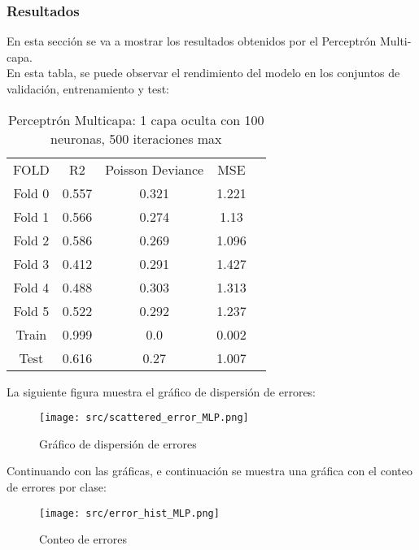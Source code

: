 \subsubsection*{Resultados}
En esta sección se va a mostrar los resultados obtenidos por el Perceptrón Multi-capa. \\
\linebreak
En esta tabla, se puede observar el rendimiento del modelo en los conjuntos de validación, entrenamiento y test:
\begin{table}[H]
	\centering
	\begin{tabular}{|c|c|c|c|c}
		\cline{1-4}
		FOLD   & R2    & Poisson Deviance & MSE   \\\cline{1-4}
		Fold 0 & 0.557 & 0.321            & 1.221 \\\cline{1-4}
		Fold 1 & 0.566 & 0.274            & 1.13  \\\cline{1-4}
		Fold 2 & 0.586 & 0.269            & 1.096 \\\cline{1-4}
		Fold 3 & 0.412 & 0.291            & 1.427 \\\cline{1-4}
		Fold 4 & 0.488 & 0.303            & 1.313 \\\cline{1-4}
		Fold 5 & 0.522 & 0.292            & 1.237 \\\cline{1-4}
		Train  & 0.999 & 0.0              & 0.002 \\\cline{1-4}
		Test   & 0.616 & 0.27             & 1.007 \\\cline{1-4}
	\end{tabular}
	\caption{Perceptrón Multicapa: 1 capa oculta con 100 neuronas, 500 iteraciones max}
	\label{tab:mlp_res}
\end{table}
La siguiente figura muestra el gráfico de dispersión de errores:
\begin{figure}[H]
	\centering
	\texttt{[image: src/scattered\_error\_MLP.png]}
	\caption{Gráfico de dispersión de errores}
	\label{fig:mlp_scattered}
\end{figure}
Continuando con las gráficas, e continuación se muestra una gráfica con el conteo de errores por clase:\\
\linebreak
\begin{figure}[H]
	\centering	\texttt{[image: src/error\_hist\_MLP.png]}
	\caption{Conteo de errores}
	\label{fig:mlp_error_plot}
\end{figure}

